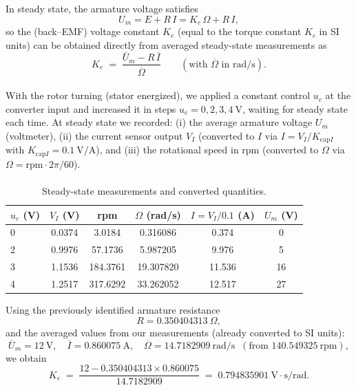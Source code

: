 \documentclass{rapportCS}
\begin{document}
In steady state, the armature voltage satisfies
\[
U_m = E + R\,I = K_e\,\Omega + R\,I,
\]
so the (back–EMF) voltage constant $K_e$ (equal to the torque constant $K_c$ in SI units) can be obtained directly from averaged steady-state measurements as
\[
K_e \;=\; \frac{\overline{U}_m - R\,\overline{I}}{\overline{\Omega}} \qquad (\text{with } \overline{\Omega}\text{ in rad/s}).
\]


\paragraph{}
With the rotor turning (stator energized), we applied a constant control $u_c$ at the converter input and increased it in steps $u_c=0,2,3,4~\mathrm{V}$, waiting for steady state each time. At steady state we recorded:
(i) the average armature voltage $U_m$ (voltmeter),
(ii) the current sensor output $V_I$ (converted to $I$ via $I=V_I/K_{\mathrm{cap}I}$ with $K_{\mathrm{cap}I}=0.1~\mathrm{V/A}$),
and (iii) the rotational speed in rpm (converted to $\Omega$ via $\Omega= \text{rpm}\cdot 2\pi/60$).

\paragraph{}
\begin{table}[H]
\centering
\caption{Steady-state measurements and converted quantities.}
\label{tab:Ke_data}
\begin{tabular}{lccccc}
\toprule
$u_c$ (V) & $V_I$ (V) & rpm & $\Omega$ (rad/s) & $I=V_I/0.1$ (A) & $U_m$ (V)\\
\midrule
0 & 0.0374 & 3.0184  & 0.316086 & 0.374  & 0 \\
2 & 0.9976 & 57.1736 & 5.987205 & 9.976  & 5 \\
3 & 1.1536 & 184.3761& 19.307820& 11.536 & 16 \\
4 & 1.2517 & 317.6292& 33.262052& 12.517 & 27 \\
\bottomrule
\end{tabular}
\end{table}

Using the previously identified armature resistance
\[
R = 0.350404313~\Omega,
\]
and the averaged values from our measurements (already converted to SI units):
\[
\overline{U}_m = 12~\text{V},\quad
\overline{I} = 0.860075~\text{A},\quad
\overline{\Omega} = 14.7182909~\text{rad/s} \;\;(\text{from } 140.549325~\text{rpm}),
\]
we obtain
\[
K_e \;=\; \frac{12 - 0.350404313 \times 0.860075}{14.7182909}
\;=\; 0.794835901~\text{V}\cdot\text{s/rad}.
\]
\end{document}
